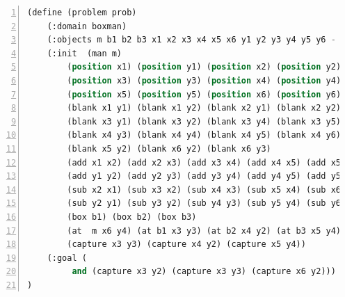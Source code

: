 \documentclass[a4paper, 11pt]{article}
\begin{document}
\begin{lstlisting}[title=domain\_boxman.pddl,frame=single,language=lisp,numbers=left]
(define (problem prob)
    (:domain boxman)
    (:objects m b1 b2 b3 x1 x2 x3 x4 x5 x6 y1 y2 y3 y4 y5 y6 - physob)
    (:init  (man m)
        (position x1) (position y1) (position x2) (position y2)
        (position x3) (position y3) (position x4) (position y4)
        (position x5) (position y5) (position x6) (position y6)
        (blank x1 y1) (blank x1 y2) (blank x2 y1) (blank x2 y2)
        (blank x3 y1) (blank x3 y2) (blank x3 y4) (blank x3 y5) (blank x3 y6)
        (blank x4 y3) (blank x4 y4) (blank x4 y5) (blank x4 y6)
        (blank x5 y2) (blank x6 y2) (blank x6 y3)
        (add x1 x2) (add x2 x3) (add x3 x4) (add x4 x5) (add x5 x6)
        (add y1 y2) (add y2 y3) (add y3 y4) (add y4 y5) (add y5 y6)
        (sub x2 x1) (sub x3 x2) (sub x4 x3) (sub x5 x4) (sub x6 x5)
        (sub y2 y1) (sub y3 y2) (sub y4 y3) (sub y5 y4) (sub y6 y5)
        (box b1) (box b2) (box b3)
        (at  m x6 y4) (at b1 x3 y3) (at b2 x4 y2) (at b3 x5 y4)
        (capture x3 y3) (capture x4 y2) (capture x5 y4))
    (:goal (
         and (capture x3 y2) (capture x3 y3) (capture x6 y2)))
)
\end{lstlisting}
\end{document}
